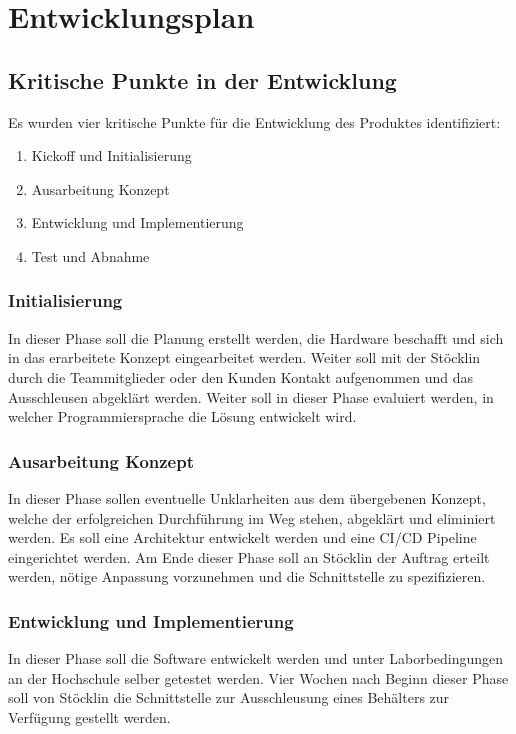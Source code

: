 \chapter{Entwicklungsplan}

\section{Kritische Punkte in der Entwicklung}
Es wurden vier kritische Punkte für die Entwicklung des Produktes identifiziert:
\begin{enumerate}
	\item Kickoff und Initialisierung
	\item Ausarbeitung Konzept
	\item Entwicklung und Implementierung
	\item Test und Abnahme
\end{enumerate}

\subsection{Initialisierung}
In dieser Phase soll die Planung erstellt werden, die Hardware beschafft und sich in das erarbeitete Konzept eingearbeitet werden. Weiter soll mit der Stöcklin durch die Teammitglieder oder den Kunden Kontakt aufgenommen und das Ausschleusen abgeklärt werden. Weiter soll in dieser Phase evaluiert werden, in welcher Programmiersprache die Lösung entwickelt wird.

\subsection{Ausarbeitung Konzept}
In dieser Phase sollen eventuelle Unklarheiten aus dem übergebenen Konzept, welche der erfolgreichen Durchführung im Weg stehen, abgeklärt und eliminiert werden. Es soll eine Architektur entwickelt werden und eine CI/CD Pipeline eingerichtet werden. Am Ende dieser Phase soll an Stöcklin der Auftrag erteilt werden, nötige Anpassung vorzunehmen und die Schnittstelle zu spezifizieren.

\subsection{Entwicklung und Implementierung}
In dieser Phase soll die Software entwickelt werden und unter Laborbedingungen an der Hochschule selber getestet werden. Vier Wochen nach Beginn dieser Phase soll von Stöcklin die Schnittstelle zur Ausschleusung eines Behälters zur Verfügung gestellt werden.

